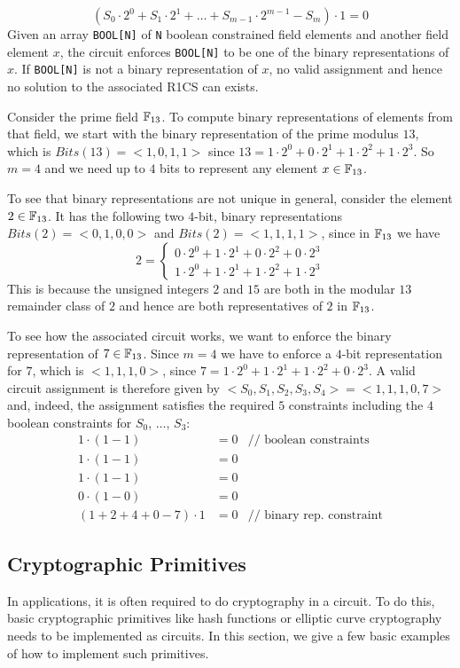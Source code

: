 $$
(S_0\cdot 2^0 + S_1\cdot 2^1 + \ldots + S_{m-1}\cdot 2^{m-1} -S_m)\cdot 1 = 0
$$
Given an array \texttt{BOOL[N]} of \texttt{N} boolean constrained field elements and another field element $x$, the circuit enforces \texttt{BOOL[N]} to be one of the binary representations of $x$. If \texttt{BOOL[N]} is not a binary representation of $x$, no valid assignment and hence no solution to the associated R1CS can exists. 
\begin{example} Consider the prime field $\mathbb{F}_{13}$. To compute binary representations of elements from that field, we start with the binary representation of the prime modulus $13$, which is $Bits(13) = <1,0,1,1>$ since $13= 1\cdot 2^0 + 0\cdot 2^1 + 1\cdot 2^2 + 1\cdot 2^3$. So $m=4$ and we need up to $4$ bits to represent any element $x\in\mathbb{F}_{13}$.

To see that binary representations are not unique in general, consider the element $2\in \mathbb{F}_{13}$. It has the following two $4$-bit, binary representations $Bits(2)=<0,1,0,0>$ and $Bits(2)=<1,1,1,1>$, since in $\mathbb{F}_{13}$ we have
$$
2 = \begin{cases}
0\cdot 2^0 + 1\cdot 2^1 + 0\cdot 2^2 + 0\cdot 2^3\\
1\cdot 2^0 + 1\cdot 2^1 + 1\cdot 2^2 + 1\cdot 2^3
\end{cases}
$$
This is because the unsigned integers $2$ and $15$ are both in the modular $13$ remainder class of $2$ and hence are both representatives of $2$ in $\mathbb{F}_{13}$.

To see how the associated circuit works, we want to enforce the binary representation of $7\in \mathbb{F}_{13}$. Since $m=4$ we have to enforce a $4$-bit representation for $7$, which is $<1,1,1,0>$, since $7= 1\cdot 2^0 + 1\cdot 2^1 + 1\cdot 2^2 + 0\cdot 2^3$. A valid circuit assignment is therefore given by $<S_0,S_1,S_2,S_3,S_4>=<1,1,1,0,7>$ and, indeed, the assignment satisfies the required $5$ constraints including the $4$ boolean constraints for $S_0$, $\ldots$, $S_3$: 
\begin{align*}
1\cdot (1-1) &= 0 & \text{// boolean constraints}\\
1\cdot (1-1) &= 0 \\
1\cdot (1-1) &= 0 \\
0\cdot (1-0) &= 0  \\
(1 + 2 + 4 + 0 -7)\cdot 1 &= 0  & \text{// binary rep. constraint}
\end{align*}
\end{example}
\subsection{Cryptographic Primitives}
In applications, it is often required to do cryptography in a circuit. To do this, basic cryptographic primitives like hash functions or elliptic curve cryptography needs to be implemented as circuits. In this section, we give a few basic examples of how to implement such primitives. 
